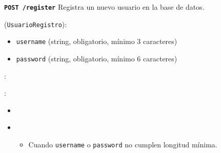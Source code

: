 \documentclass[a4paper,11pt,spanish]{sphinxmanual}
\newcommand{\robotoMonoBold}{\fontseries{b}\selectfont\ttfamily}
\renewcommand{\sphinxcode}[1]{\textcolor{sphinxorangeCode}{{\robotoMonoBold #1}}}
\renewcommand{\sphinxbfcode}[1]{\textbf{\sphinxcode{#1}}}
\renewcommand{\sphinxupquote}[1]{\texttt{#1}}
\begin{document}
\begin{fulllineitems}
\label{\detokenize{endpoints:post--register}}
\pysigstartsignatures
\pysigline
{\sphinxbfcode{\sphinxupquote{POST~}}\sphinxbfcode{\sphinxupquote{/register}}}
\pysigstopsignatures
\sphinxAtStartPar
Registra un nuevo usuario en la base de datos.

\sphinxAtStartPar
{} (\sphinxcode{\sphinxupquote{UsuarioRegistro}}):
\begin{itemize}
\item {} 
\sphinxAtStartPar
\sphinxcode{\sphinxupquote{username}} (string, obligatorio, mínimo 3 caracteres)

\item {} 
\sphinxAtStartPar
\sphinxcode{\sphinxupquote{password}} (string, obligatorio, mínimo 6 caracteres)

\end{itemize}

\sphinxAtStartPar
{}:

\begin{sphinxVerbatim}[commandchars=\\\{\}]
  
 
 

\end{sphinxVerbatim}

\sphinxAtStartPar
{}:
\begin{itemize}
\item {} 
\sphinxAtStartPar
{}

\begin{sphinxVerbatim}[commandchars=\\\{\}]
\end{sphinxVerbatim}

\item {} 
\sphinxAtStartPar
{}
\begin{itemize}
\item {} 
\sphinxAtStartPar
Cuando \sphinxcode{\sphinxupquote{username}} o \sphinxcode{\sphinxupquote{password}} no cumplen longitud mínima.


\end{itemize}
\end{itemize}
\end{fulllineitems}
\end{document}
